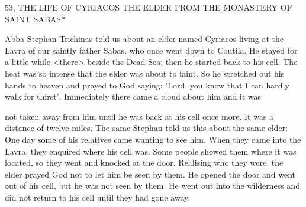 53, THE LIFE OF CYRIACOS THE ELDER
FROM THE MONASTERY OF SAINT SABAS*

Abba Stephan Trichinas told us about an elder named Cyriacos
living at the Lavra of our saintly father Sabas, who once went down
to Coutila. He stayed for a little while <there> beside the Dead Sea;
then he started back to his cell. The heat was so intense that the
elder was about to faint. So he stretched out his hands to heaven
and prayed to God saying: 'Lord, you know that I can hardly walk
for thirst', Immediately there came a cloud about him and it was

not taken away from him until he was back at his cell once more.
It was a distance of twelve miles. The same Stephan told us this
about the same elder: One day some of his relatives came wanting
to see him. When they came into the Lavra, they enquired where his
cell was. Some people showed them where it was located, so they
went and knocked at the door. Realising who they were, the elder
prayed God not to let him be seen by them. He opened the door
and went out of his cell, but he was not seen by them. He went out
into the wilderness and did not return to his cell until they had gone
away.


